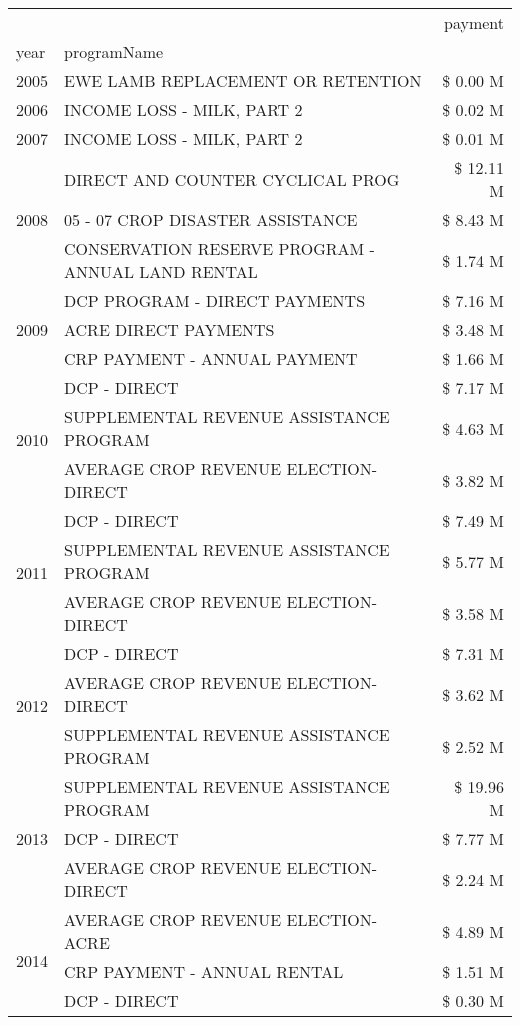 \begin{tabular}{llr}
\toprule
 &  & payment \\
year & programName &  \\
\midrule
2005 & EWE LAMB REPLACEMENT OR RETENTION & \$ 0.00 M \\
\cline{1-3}
2006 & INCOME LOSS - MILK, PART 2 & \$ 0.02 M \\
\cline{1-3}
2007 & INCOME LOSS - MILK, PART 2 & \$ 0.01 M \\
\cline{1-3}
\multirow[t]{3}{*}{2008} & DIRECT AND COUNTER CYCLICAL PROG & \$ 12.11 M \\
 & 05 - 07 CROP DISASTER ASSISTANCE & \$ 8.43 M \\
 & CONSERVATION RESERVE PROGRAM - ANNUAL LAND RENTAL & \$ 1.74 M \\
\cline{1-3}
\multirow[t]{3}{*}{2009} & DCP PROGRAM - DIRECT PAYMENTS & \$ 7.16 M \\
 & ACRE DIRECT PAYMENTS & \$ 3.48 M \\
 & CRP PAYMENT - ANNUAL PAYMENT & \$ 1.66 M \\
\cline{1-3}
\multirow[t]{3}{*}{2010} & DCP - DIRECT & \$ 7.17 M \\
 & SUPPLEMENTAL REVENUE ASSISTANCE PROGRAM & \$ 4.63 M \\
 & AVERAGE CROP REVENUE ELECTION-DIRECT & \$ 3.82 M \\
\cline{1-3}
\multirow[t]{3}{*}{2011} & DCP - DIRECT & \$ 7.49 M \\
 & SUPPLEMENTAL REVENUE ASSISTANCE PROGRAM & \$ 5.77 M \\
 & AVERAGE CROP REVENUE ELECTION-DIRECT & \$ 3.58 M \\
\cline{1-3}
\multirow[t]{3}{*}{2012} & DCP - DIRECT & \$ 7.31 M \\
 & AVERAGE CROP REVENUE ELECTION-DIRECT & \$ 3.62 M \\
 & SUPPLEMENTAL REVENUE ASSISTANCE PROGRAM & \$ 2.52 M \\
\cline{1-3}
\multirow[t]{3}{*}{2013} & SUPPLEMENTAL REVENUE ASSISTANCE PROGRAM & \$ 19.96 M \\
 & DCP - DIRECT & \$ 7.77 M \\
 & AVERAGE CROP REVENUE ELECTION-DIRECT & \$ 2.24 M \\
\cline{1-3}
\multirow[t]{3}{*}{2014} & AVERAGE CROP REVENUE ELECTION-ACRE & \$ 4.89 M \\
 & CRP PAYMENT - ANNUAL RENTAL & \$ 1.51 M \\
 & DCP - DIRECT & \$ 0.30 M \\

\end{tabular}
